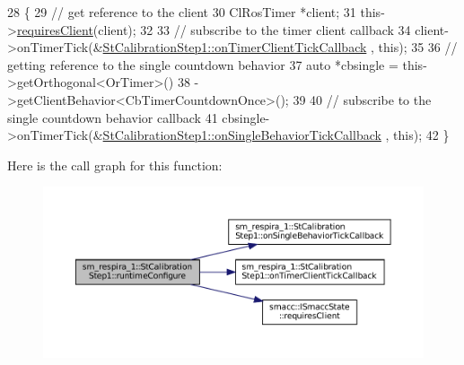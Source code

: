 \begin{DoxyCode}
28     \{
29         \textcolor{comment}{// get reference to the client}
30         ClRosTimer *client;
31         this->\hyperlink{classsmacc_1_1ISmaccState_a7f95c9f0a6ea2d6f18d1aec0519de4ac}{requiresClient}(client);
32 
33         \textcolor{comment}{// subscribe to the timer client callback}
34         client->onTimerTick(&\hyperlink{structsm__respira__1_1_1StCalibrationStep1_a0076674470e3964b263531f3f41c73e6}{StCalibrationStep1::onTimerClientTickCallback}
      , \textcolor{keyword}{this});
35 
36         \textcolor{comment}{// getting reference to the single countdown behavior}
37         \textcolor{keyword}{auto} *cbsingle = this->getOrthogonal<OrTimer>()
38                              ->getClientBehavior<CbTimerCountdownOnce>();
39 
40         \textcolor{comment}{// subscribe to the single countdown behavior callback}
41         cbsingle->onTimerTick(&\hyperlink{structsm__respira__1_1_1StCalibrationStep1_a5753db04586e997320c8e3916c6c2642}{StCalibrationStep1::onSingleBehaviorTickCallback}
      , \textcolor{keyword}{this});
42     \}
\end{DoxyCode}
Here is the call graph for this function\+:
\nopagebreak
\begin{figure}[H]
\begin{center}
\leavevmode
\includegraphics[width=350pt]{structsm__respira__1_1_1StCalibrationStep1_a041c623fb452bde3f3abd51eb5d9a7e6_cgraph}
\end{center}
\end{figure}
\mbox{\label{structsm__respira__1_1_1StCalibrationStep1_a2e817276acf8ab351121f8459e00b0f2}} 

